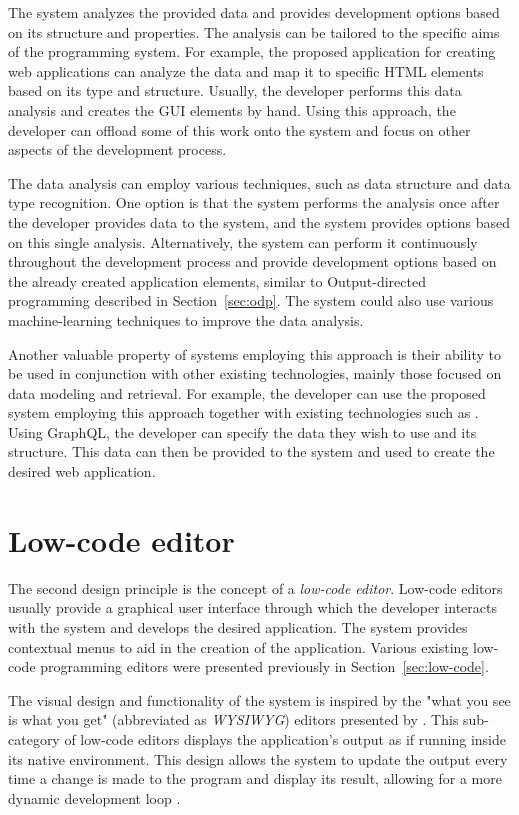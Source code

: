 The system analyzes the provided data and provides development options based on its structure and properties.
The analysis can be tailored to the specific aims of the programming system.
For example, the proposed application for creating web applications can analyze the data and map it to specific HTML elements based on its type and structure.
Usually, the developer performs this data analysis and creates the GUI elements by hand.
Using this approach, the developer can offload some of this work onto the system and focus on other aspects of the development process.

The data analysis can employ various techniques, such as data structure and data type recognition.
One option is that the system performs the analysis once after the developer provides data to the system, and the system provides options based on this single analysis.
Alternatively, the system can perform it continuously throughout the development process and provide development options based on the already created application elements, similar to Output-directed programming described in Section~\ref{sec:odp}.
The system could also use various machine-learning techniques to improve the data analysis.

Another valuable property of systems employing this approach is their ability to be used in conjunction with other existing technologies, mainly those focused on data modeling and retrieval.
For example, the developer can use the proposed system employing this approach together with existing technologies such as \citet{graphql}.
Using GraphQL, the developer can specify the data they wish to use and its structure.
This data can then be provided to the system and used to create the desired web application.




\section{Low-code editor}

The second design principle is the concept of a \emph{low-code editor}.
Low-code editors usually provide a graphical user interface through which the developer interacts with the system and develops the desired application.
The system provides contextual menus to aid in the creation of the application.
Various existing low-code programming editors were presented previously in Section~\ref{sec:low-code}.

The visual design and functionality of the system is inspired by the "what you see is what you get" (abbreviated as \emph{WYSIWYG}) editors presented by \citet{Yang_Gupta_Botev_Churchill_Levchenko_Shanmugasundaram_2008}.
This sub-category of low-code editors displays the application's output as if running inside its native environment.
This design allows the system to update the output every time a change is made to the program and display its result, allowing for a more dynamic development loop \cite{output-directed-programming}.

